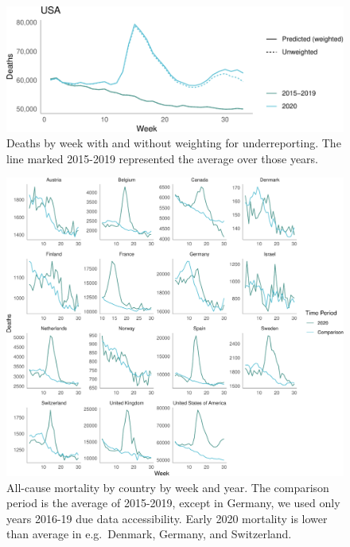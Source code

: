 \documentclass[
]{article}
\begin{document}
\begin{figure}
\centering
\includegraphics{extended_supplement_FINAL_files/figure-latex/US_weights-1.pdf}
\caption{\label{supp.fig.weighting} Deaths by week with and without
weighting for underreporting. The line marked 2015-2019 represented the
average over those years.}
\end{figure}

\clearpage

\begin{figure}
\centering
\includegraphics{extended_supplement_FINAL_files/figure-latex/excess-1.pdf}
\caption{\label{supp.weekly.deaths} All-cause mortality by country by
week and year. The comparison period is the average of 2015-2019, except
in Germany, we used only years 2016-19 due data accessibility. Early
2020 mortality is lower than average in e.g.~Denmark, Germany, and
Switzerland.}
\end{figure}

\clearpage
\end{document}
